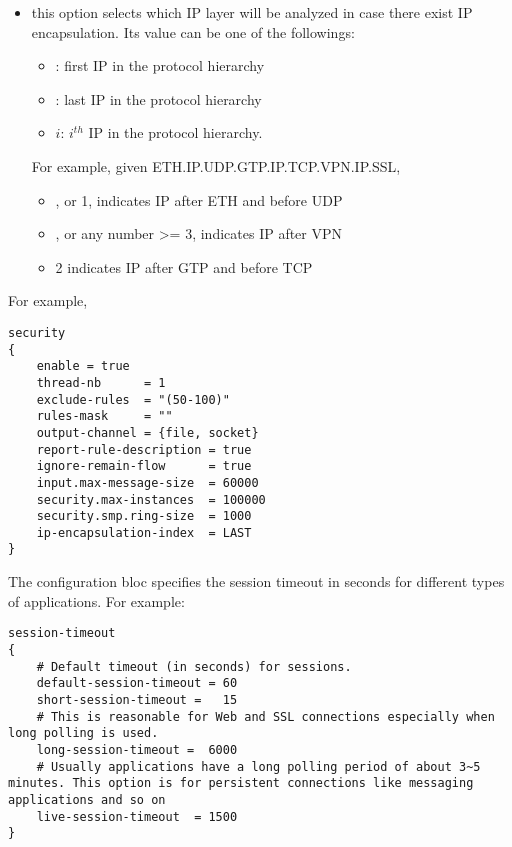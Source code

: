 \begin{itemize}
    
    \item 
     this option selects which IP layer will be analyzed in case there exist IP encapsulation.
    Its value can be one of the followings:
    
    \begin{itemize}
      \item {}: first IP in the protocol hierarchy
      \item {}:  last IP in the protocol hierarchy
      \item $i$: $i^{th}$  IP in the protocol hierarchy.
   \end{itemize}    
                                     
   For example, given ETH.IP.UDP.GTP.IP.TCP.VPN.IP.SSL,
   
   \begin{itemize}
     \item  {}, or 1, indicates IP after ETH and before UDP
     \item  {}, or any number >= 3, indicates IP after VPN
     \item  2 indicates IP after GTP and before TCP
   \end{itemize}
                                         
\end{itemize}

For example,
\begin{lstlisting}[style=CONFIG]
security
{    
    enable = true
    thread-nb      = 1  
    exclude-rules  = "(50-100)"
    rules-mask     = "" 
    output-channel = {file, socket}
    report-rule-description = true
    ignore-remain-flow      = true
    input.max-message-size  = 60000
    security.max-instances  = 100000
    security.smp.ring-size  = 1000
    ip-encapsulation-index  = LAST 
}
\end{lstlisting}



The  configuration bloc specifies the session timeout in seconds for different types of applications. 
For example:

\begin{lstlisting}[style=CONFIG]
session-timeout 
{     
    # Default timeout (in seconds) for sessions.
    default-session-timeout = 60  
    short-session-timeout =   15
    # This is reasonable for Web and SSL connections especially when long polling is used.
    long-session-timeout =  6000  
    # Usually applications have a long polling period of about 3~5 minutes. This option is for persistent connections like messaging applications and so on
    live-session-timeout  = 1500  
}
\end{lstlisting}	


